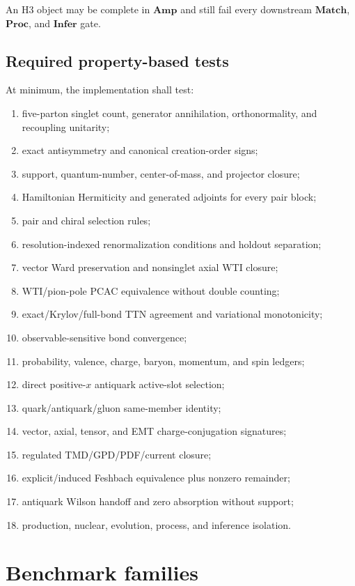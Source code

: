 \documentclass[11pt]{article}
\newcommand{\Amp}{\mathbf{Amp}}
\newcommand{\Match}{\mathbf{Match}}
\newcommand{\Proc}{\mathbf{Proc}}
\newcommand{\Infer}{\mathbf{Infer}}
\begin{document}
An H3 object may be complete in \(\Amp\) and still fail every downstream
\(\Match\), \(\Proc\), and \(\Infer\) gate.

\subsection{Required property-based tests}

At minimum, the implementation shall test:
\begin{enumerate}
 \item five-parton singlet count, generator annihilation, orthonormality, and
       recoupling unitarity;
 \item exact antisymmetry and canonical creation-order signs;
 \item support, quantum-number, center-of-mass, and projector closure;
 \item Hamiltonian Hermiticity and generated adjoints for every pair block;
 \item pair and chiral selection rules;
 \item resolution-indexed renormalization conditions and holdout separation;
 \item vector Ward preservation and nonsinglet axial WTI closure;
 \item WTI/pion-pole PCAC equivalence without double counting;
 \item exact/Krylov/full-bond TTN agreement and variational monotonicity;
 \item observable-sensitive bond convergence;
 \item probability, valence, charge, baryon, momentum, and spin ledgers;
 \item direct positive-\(x\) antiquark active-slot selection;
 \item quark/antiquark/gluon same-member identity;
 \item vector, axial, tensor, and EMT charge-conjugation signatures;
 \item regulated TMD/GPD/PDF/current closure;
 \item explicit/induced Feshbach equivalence plus nonzero remainder;
 \item antiquark Wilson handoff and zero absorption without support;
 \item production, nuclear, evolution, process, and inference isolation.
\end{enumerate}

\section{Benchmark families}
\label{sec:benchmarks}
\end{document}
